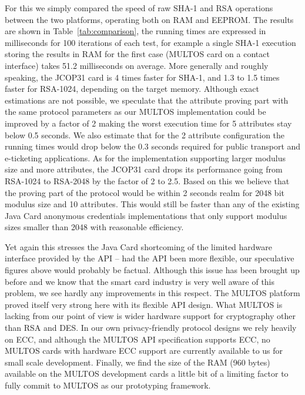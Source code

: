 For this we simply compared the speed of raw SHA-1 and RSA operations
between the two platforms, operating both on RAM and EEPROM.  The
results are shown in Table~\ref{tab:comparison}, the running times are
expressed in milliseconds for 100 iterations of each test, for example
a single SHA-1 execution storing the results in RAM for the first case (MULTOS
card on a contact interface) takes 51.2 milliseconds on average.
More generally and roughly speaking,
the JCOP31 card is 4 times faster for SHA-1, and 1.3 to 1.5 times
faster for RSA-1024, depending on the target memory.
Although exact estimations are not possible, we
speculate that the attribute proving part with the same protocol
parameters as our MULTOS implementation could be improved by a factor
of 2 making the worst execution time for 5 attributes stay below 0.5 seconds.
We also estimate that for the 2 attribute configuration the running times
would drop below the 0.3 seconds required for public transport and e-ticketing applications.
As for the implementation supporting
larger modulus size and more attributes, the JCOP31 card drops
its performance going from RSA-1024 to RSA-2048 by the factor of 2 to 2.5.
Based on this we believe that the
proving part of the protocol would be within 2 seconds realm for 2048
bit modulus size and 10 attributes. This would still be faster
than any of the existing Java Card anonymous credentials
implementations that only support modulus sizes smaller than 2048
with reasonable efficiency.

Yet again this stresses the Java Card shortcoming of the limited
hardware interface provided by the API -- had the API been more
flexible, our speculative figures above would probably be factual.
Although this issue has been brought up before and we know
that the smart card industry is very well aware of this problem, we
see hardly any improvements in this respect. The MULTOS platform
proved itself very strong here with its flexible API design. What
MULTOS is lacking from our point of view is wider hardware support for
cryptography other than RSA and DES. In our own privacy-friendly protocol
designs we rely heavily on ECC, and although the MULTOS API
specification supports ECC, no MULTOS cards with hardware ECC support are
currently available to us for small scale development.
Finally, we find the size of the RAM
(960 bytes) available on the MULTOS development cards a little bit of
a limiting factor to fully commit to MULTOS as our prototyping
framework.
